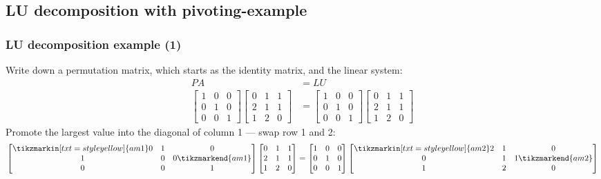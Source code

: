 \documentclass[11pt,table,final,xcolor={usenames,dvipsnames,table}]{beamer}
\begin{document}
\subsection*{LU decomposition with pivoting-example}
\begin{frame}[fragile]
  \frametitle{LU decomposition example (1)}
  Write down a permutation matrix, which starts as the identity matrix, and the linear system:
  \begin{align*}
    PA &= LU \\
    \begin{bmatrix}
      1 & 0 & 0\\
      0 & 1 & 0\\
      0 & 0 & 1
    \end{bmatrix} 
    \begin{bmatrix}
      0 & 1 & 1\\
      2 & 1 & 1\\
      1 & 2 & 0
      \end{bmatrix}&= 
      \begin{bmatrix}
      1 & 0 & 0\\
      0 & 1 & 0\\
      0 & 0 & 1
      \end{bmatrix}
      \begin{bmatrix}
      0 & 1 & 1\\
      2 & 1 & 1\\
      1 & 2 & 0
      \end{bmatrix}
  \end{align*}
  \pause
  Promote the largest value into the diagonal of column 1 --- swap row 1 and 2:
    \[
      \begin{bmatrix}
	\tikzmarkin[txt=style yellow]{am1} 0 & 1 & 0\\
	1 & 0 & 0 \tikzmarkend{am1}\\
	0 & 0 & 1
      \end{bmatrix} 
      \begin{bmatrix}
	0 & 1 & 1\\
	2 & 1 & 1\\
	1 & 2 & 0
      \end{bmatrix}= 
      \begin{bmatrix}
	1 & 0 & 0\\
	0 & 1 & 0\\
	0 & 0 & 1
      \end{bmatrix}
      \begin{bmatrix}
	\tikzmarkin[txt=style yellow]{am2}2 & 1 & 0\\
	0 & 1 & 1 \tikzmarkend{am2}\\
	1 & 2 & 0
      \end{bmatrix}
    \]
\end{frame}
\end{document}
